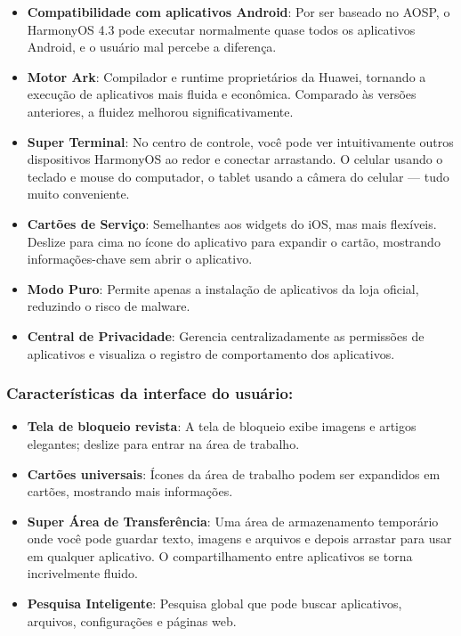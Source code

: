 \begin{itemize}
  \item \textbf{Compatibilidade com aplicativos Android}: Por ser baseado no AOSP, o HarmonyOS 4.3 pode executar normalmente quase todos os aplicativos Android, e o usuário mal percebe a diferença.
  \item \textbf{Motor Ark}: Compilador e runtime proprietários da Huawei, tornando a execução de aplicativos mais fluida e econômica. Comparado às versões anteriores, a fluidez melhorou significativamente.
  \item \textbf{Super Terminal}: No centro de controle, você pode ver intuitivamente outros dispositivos HarmonyOS ao redor e conectar arrastando. O celular usando o teclado e mouse do computador, o tablet usando a câmera do celular — tudo muito conveniente.
  \item \textbf{Cartões de Serviço}: Semelhantes aos widgets do iOS, mas mais flexíveis. Deslize para cima no ícone do aplicativo para expandir o cartão, mostrando informações-chave sem abrir o aplicativo.
  \item \textbf{Modo Puro}: Permite apenas a instalação de aplicativos da loja oficial, reduzindo o risco de malware.
  \item \textbf{Central de Privacidade}: Gerencia centralizadamente as permissões de aplicativos e visualiza o registro de comportamento dos aplicativos.
\end{itemize}

\subsubsection*{Características da interface do usuário:}

\begin{itemize}
  \item \textbf{Tela de bloqueio revista}: A tela de bloqueio exibe imagens e artigos elegantes; deslize para entrar na área de trabalho.
  \item \textbf{Cartões universais}: Ícones da área de trabalho podem ser expandidos em cartões, mostrando mais informações.
  \item \textbf{Super Área de Transferência}: Uma área de armazenamento temporário onde você pode guardar texto, imagens e arquivos e depois arrastar para usar em qualquer aplicativo. O compartilhamento entre aplicativos se torna incrivelmente fluido.
  \item \textbf{Pesquisa Inteligente}: Pesquisa global que pode buscar aplicativos, arquivos, configurações e páginas web.
\end{itemize}

